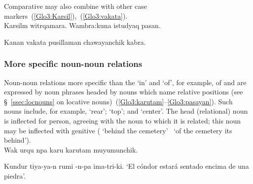 {\noindent
Comparative  may also combine with other case markers~(\ref{Glo3:Karsil}),~(\ref{Glo3:vakata}).\\

%
{Karsilm witrqamara. Wambra:kuna istudyaq pasan.}%
{}%
{}{}%

%
{Kanan vakata pusillaman chawayanchik kabra.}%
{}%
{}{}%

\subsubsection{More specific noun-noun relations}\label{sssec:msnnr}
Noun-noun relations more specific than the ‘in’ and ‘of’, for example, of  and  are expressed by noun phrases headed by nouns which name relative positions (see §~\ref{ssec:locnouns} on locative nouns)~(\ref{Glo3:karutam}--\ref{Glo3:pasayan}). Such nouns include, for example,  ‘rear’;  ‘top’; and  ‘center’. The head (relational) noun is inflected for person, agreeing with the noun to which it is related; this noun may be inflected with genitive  ( ‘behind the cemetery’ \lit~‘of the cemetery its behind’).\\

%
{Wak urqu npa karu karutam muyumunchik.}%
{}%
{}{}%

%
{Kundur tiya-ya-n rumi -n-pa ima-tri-ki.}%
{}%
{‘El cóndor estará sentado encima de una piedra’.}%
{}{}%

}
